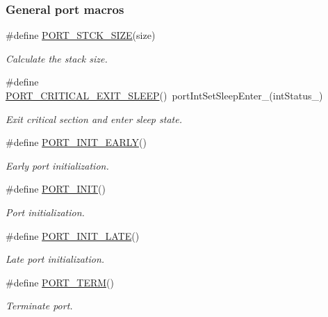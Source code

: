 \subsubsection*{General port macros}
\begin{DoxyCompactItemize}
\item 
\#define \hyperlink{group__template__cpu__intf_gacb3a46e89d327fbaf5c122fe23877b24}{P\-O\-R\-T\-\_\-\-S\-T\-C\-K\-\_\-\-S\-I\-Z\-E}(size)
\begin{DoxyCompactList}\small\item\em Calculate the stack size. \end{DoxyCompactList}\item 
\#define \hyperlink{group__template__cpu__intf_gad699a79233d442ae90a69c113e314542}{P\-O\-R\-T\-\_\-\-C\-R\-I\-T\-I\-C\-A\-L\-\_\-\-E\-X\-I\-T\-\_\-\-S\-L\-E\-E\-P}()~port\-Int\-Set\-Sleep\-Enter\-\_\-(int\-Status\-\_\-)
\begin{DoxyCompactList}\small\item\em Exit critical section and enter sleep state. \end{DoxyCompactList}\item 
\#define \hyperlink{group__template__cpu__intf_gac9622b857ad35f73ae92a44a9d0f717c}{P\-O\-R\-T\-\_\-\-I\-N\-I\-T\-\_\-\-E\-A\-R\-L\-Y}()
\begin{DoxyCompactList}\small\item\em Early port initialization. \end{DoxyCompactList}\item 
\#define \hyperlink{group__template__cpu__intf_ga0da077bab2264b11c4107f0bef279b86}{P\-O\-R\-T\-\_\-\-I\-N\-I\-T}()
\begin{DoxyCompactList}\small\item\em Port initialization. \end{DoxyCompactList}\item 
\#define \hyperlink{group__template__cpu__intf_ga8bfda2e0a8029092d0377640ba228b6d}{P\-O\-R\-T\-\_\-\-I\-N\-I\-T\-\_\-\-L\-A\-T\-E}()
\begin{DoxyCompactList}\small\item\em Late port initialization. \end{DoxyCompactList}\item 
\#define \hyperlink{group__template__cpu__intf_gab2a39b200d6e6806896ba45a9c3a9d1e}{P\-O\-R\-T\-\_\-\-T\-E\-R\-M}()
\begin{DoxyCompactList}\small\item\em Terminate port. \end{DoxyCompactList}\end{DoxyCompactItemize}


